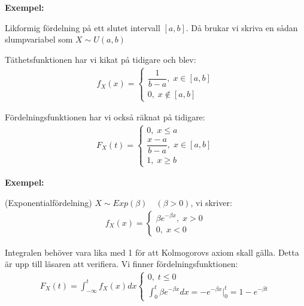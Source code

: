 \par\bigskip
\noindent\textbf{Exempel:}\par
\noindent Likformig fördelning på ett slutet intervall $[a,b]$. Då brukar vi skriva en sådan slumpvariabel som $X\sim U(a,b)$\par
\noindent Täthetsfunktionen har vi kikat på tidigare och blev:
\begin{equation*}
  \begin{gathered}
    f_X(x) =\begin{cases}\dfrac{1}{b-a},\; x\in[a,b]\\0,\;x\notin[a,b]\end{cases}
  \end{gathered}
\end{equation*}\par
\noindent Fördelningsfunktionen har vi också räknat på tidigare:
\begin{equation*}
  \begin{gathered}
    F_X(t) = \begin{cases}0,\;x\leq a\\\dfrac{x-a}{b-a},\;x\in[a,b]\\1,\;x\geq b\end{cases}
  \end{gathered}
\end{equation*}
\par\bigskip
\noindent\textbf{Exempel:}\par
\noindent (Exponentialfördelning) $X\sim Exp(\beta)\quad (\beta>0)$, vi skriver:
\begin{equation*}
  \begin{gathered}
    f_X(x) = \begin{cases}\beta e^{-\beta x},\; x>0\\0,\;x<0\end{cases}
  \end{gathered}
\end{equation*}\par
\noindent Integralen behöver vara lika med 1 för att Kolmogorovs axiom skall gälla. Detta är upp till läsaren att verifiera. Vi finner fördelningsfunktionen:
\begin{equation*}
  \begin{gathered}
    F_X(t) = \int_{-\infty}^{t}f_X(x)dx\begin{cases}0,\; t\leq 0\\\int_{0}^{t}\beta e^{-\beta x}dx = -e^{-\beta x}|_0^t = 1-e^{-\beta t}\end{cases}
  \end{gathered}
\end{equation*}
